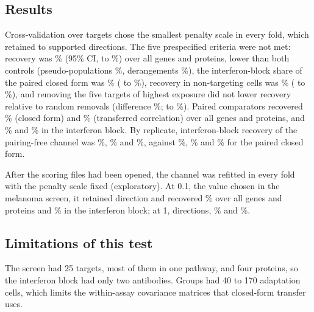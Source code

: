 \subsection*{Results}
Cross-validation over targets chose the smallest penalty scale in every fold,
which retained \RpDimSMedian{} to \RpDimSMax{} supported directions. The five
prespecified criteria were not met: recovery was \RpPrimary\% (95\% CI,
\RpPrimaryLo{} to \RpPrimaryHi\%) over all genes and proteins, lower than both
controls (pseudo-populations \RpAllPseudo\%, derangements \RpAllDerange\%), the
interferon-block share of the paired closed form was \RpIfnShare\%
(\RpIfnShareLo{} to \RpIfnShareHi\%), recovery in non-targeting cells was \RpNtPrimary\%
(\RpNtPrimaryLo{} to \RpNtPrimaryHi\%), and removing the five targets of highest
exposure did not lower recovery relative to random removals (difference
\RpRemDiff\%; \RpRemDiffLo{} to \RpRemDiffHi\%). Paired comparators recovered
\RpPaired\% (closed form) and \RpAllTrans\% (transferred correlation) over all genes
and proteins, and \RpIfnPaired\% and \RpIfnTrans\% in the interferon block. By
replicate, interferon-block recovery of the pairing-free channel was
\RpRepOneIfnPf\%, \RpRepThreeIfnPf\% and \RpRepFourIfnPf\%, against \RpRepOneIfnPaired\%,
\RpRepThreeIfnPaired\% and \RpRepFourIfnPaired\% for the paired closed form.

After the scoring files had been opened, the channel was refitted in every fold with the penalty scale
fixed (exploratory). At 0.1, the value chosen in the
melanoma screen, it retained \RpFixedPointOneDim{} direction and recovered
\RpFixedPointOneAll\% over all genes and proteins and \RpFixedPointOneIfn\% in the
interferon block; at 1, \RpFixedOneDim{} directions, \RpFixedOneAll\% and
\RpFixedOneIfn\%.

\begin{table}[h]
\caption{\textbf{Recovered fraction in the replication screen (\%).} Test targets:
\RpGroups{} target-by-replicate groups from \RpTestTargets{} targets, each held out in
turn. Non-targeting cells: three replicates. Controls and random removals are
averages over their draws.}
\label{tab:rep}
\centering\scriptsize\setlength{\tabcolsep}{3pt}

\end{table}

\subsection*{Limitations of this test}
The screen had 25 targets, most of them in one pathway, and four proteins, so
the interferon block had only two antibodies. Groups had 40 to 170 adaptation
cells, which limits the within-assay covariance matrices that closed-form transfer
uses.
